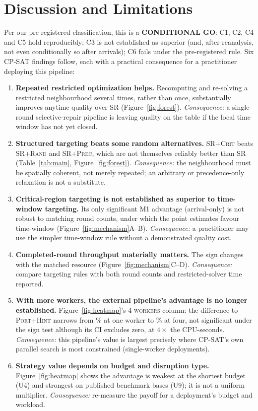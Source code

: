 \documentclass[letterpaper]{article} %
\newcommand{\base}{\textsc{SR}}
\newcommand{\crit}{\textsc{SR+Crit}}
\newcommand{\rnd}{\textsc{SR+Rand}}
\newcommand{\precn}{\textsc{SR+Prec}}
\newcommand{\ph}{\textsc{Port+Hint}}
\begin{document}
\section{Discussion and Limitations}
\label{sec:discussion}

Per our pre-registered classification, this is a \textbf{CONDITIONAL GO}: C1, C2, C4 and C5 hold reproducibly; C3 is not established as superior (and, after reanalysis, not even conditionally so after arrivals); C6 fails under the pre-registered rule. Six CP-SAT findings follow, each with a practical consequence for a practitioner deploying this pipeline:

\begin{enumerate}
\item \textbf{Repeated restricted optimization helps.} Recomputing and re-solving a restricted neighbourhood several times, rather than once, substantially improves anytime quality over \base{} (Figure~\ref{fig:forest}). \emph{Consequence:} a single-round selective-repair pipeline is leaving quality on the table if the local time window has not yet closed.
\item \textbf{Structured targeting beats some random alternatives.} \crit{} beats \rnd{} and \precn{}, which are not themselves reliably better than \base{} (Table~\ref{tab:main}, Figure~\ref{fig:forest}). \emph{Consequence:} the neighbourhood must be spatially coherent, not merely repeated; an arbitrary or precedence-only relaxation is not a substitute.
\item \textbf{Critical-region targeting is not established as superior to time-window targeting.} Its only significant M1 advantage (arrival-only) is not robust to matching round counts, under which the point estimates favour time-window (Figure~\ref{fig:mechanism}A--B). \emph{Consequence:} a practitioner may use the simpler time-window rule without a demonstrated quality cost.
\item \textbf{Completed-round throughput materially matters.} The sign changes with the matched resource (Figure~\ref{fig:mechanism}C--D). \emph{Consequence:} compare targeting rules with both round counts and restricted-solver time reported.
\item \textbf{With more workers, the external pipeline's advantage is no longer established.} Figure~\ref{fig:heatmap}'s \textsc{4 workers} column: the difference to \ph{} narrows from \UOneBTwocritVsBSixporthintRel\% at one worker to \UThreeBTwocritVsBSixporthintRel\% at four, not significant under the sign test although its CI excludes zero, at $4\times$ the CPU-seconds. \emph{Consequence:} this pipeline's value is largest precisely where CP-SAT's own parallel search is most constrained (single-worker deployments).
\item \textbf{Strategy value depends on budget and disruption type.} Figure~\ref{fig:heatmap} shows the advantage is weakest at the shortest budget (U4) and strongest on published benchmark bases (U9); it is not a uniform multiplier. \emph{Consequence:} re-measure the payoff for a deployment's budget and workload.
\end{enumerate}
\end{document}

